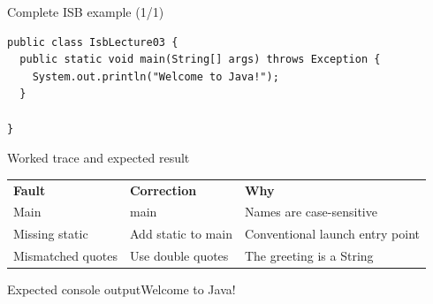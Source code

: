\documentclass[10pt,aspectratio=169]{beamer}
\begin{document}
\begin{frame}[fragile,t]{Complete ISB example (1/1)}
\begin{lstlisting}
public class IsbLecture03 {
  public static void main(String[] args) throws Exception {
    System.out.println("Welcome to Java!");
  }

}
\end{lstlisting}
\end{frame}

\begin{frame}[fragile,t]{Worked trace and expected result}
\small\renewcommand{\arraystretch}{1.4}
\begin{tabularx}{\textwidth}{>{\raggedright\arraybackslash}X>{\raggedright\arraybackslash}X>{\raggedright\arraybackslash}X}\rowcolor{navy}
\color{white}\bfseries Fault & \color{white}\bfseries Correction & \color{white}\bfseries Why\\
Main & main & Names are case{-}sensitive\\
Missing static & Add static to main & Conventional launch entry point\\
Mismatched quotes & Use double quotes & The greeting is a String\\
\end{tabularx}\par\vspace{2mm}
\begin{block}{Expected console output}\ttfamily\footnotesize Welcome to Java!\end{block}
\end{frame}
\end{document}
